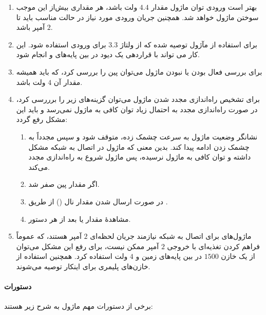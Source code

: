\begin{enumerate}[nosep]
    \item بهتر است ورودی توان ماژول مقدار $4.4$ ولت باشد، هر مقداری بیش‌از این موجب سوختن ماژول خواهد شد. همچنین جریان ورودی مورد نیاز در حالت مناسب باید تا $2$ آمپر باشد.
    \item برای استفاده از مآژول توصیه شده که از ولتاژ $3.3$ برای ورودی استفاده شود. این کار می تواند با قراردهی یک دیود در بین پایه‌های  و  انجام شود.
    \item برای بررسی فعال بودن یا نبودن ماژول می‌توان پین  را بررسی کرد، که باید همیشه مقدار آن $4$ ولت باشد.
    \item برای تشخیص راه‌اندازی مجدد شدن ماژول می‌توان گزینه‌های زیر را برررسی کرد،
    در صورت راه‌اندازی مجدد به احتمال زیاد توان کافی به ماژول نمی‌رسد و باید این مشکل رفع گردد:

    \begin{enumerate}[nosep]
        \item نشانگر  وضعیت ماژول به سرعت چشمک زده، متوقف شود و سپس مجدداً به چشمک زدن ادامه پیدا کند. بدین معنی که ماژول در اتصال به شبکه مشکل داشته و توان کافی به ماژول نرسیده، پس ماژول شروع به راه‌اندازی مجدد می‌کند.
        \item اگر مقدار پین  صفر شد.
        \item در صورت ارسال شدن مقدار نال () از طریق .
        \item مشاهدهٔ مقدار یا  بعد از هر دستور.
    \end{enumerate}
    \item ماژول‌های  برای اتصال به شبکه نیازمند جریان لحظه‌ای $2$ آمپر هستند،
    که عموماً فراهم کردن تغذیه‌ای با خروجی $2$ آمپر ممکن نیست، برای رفع این مشکل می‌توان از یک خازن $1500$ در بین پایه‌های زمین و $4$ ولت استفاده کرد.
    همچنین استفاده از خازن‌های پلیمری برای اینکار توصیه می‌شوند.
\end{enumerate}


\paragraph{دستورات}\label{par2:subsubsec1:subsec1:sec2:chap5}

برخی از دستورات مهم ماژول به شرح زیر هستند:

